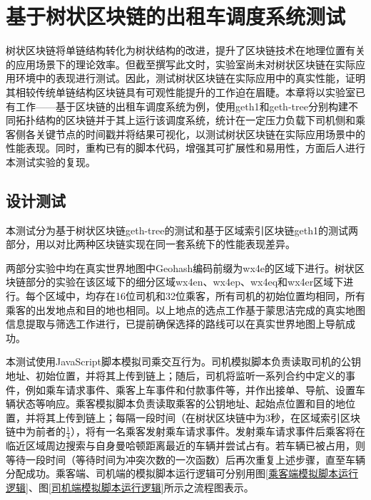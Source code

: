 %
%
%
%
%

\chapter{基于树状区块链的出租车调度系统测试}

树状区块链将单链结构转化为树状结构的改进，提升了区块链技术在地理位置有关的应用场景下的理论效率。但截至撰写此文时，实验室尚未对树状区块链在实际应用环境中的表现进行测试。因此，测试树状区块链在实际应用中的真实性能，证明其相较传统单链结构区块链具有可观性能提升的工作迫在眉睫。本章将以实验室已有工作——基于区块链的出租车调度系统为例，使用geth1和geth-tree分别构建不同拓扑结构的区块链并于其上运行该调度系统，统计在一定压力负载下司机侧和乘客侧各关键节点的时间戳并将结果可视化，以测试树状区块链在实际应用场景中的性能表现。同时，重构已有的脚本代码，增强其可扩展性和易用性，方面后人进行本测试实验的复现。

\section{设计测试}

本测试分为基于树状区块链geth-tree的测试和基于区域索引区块链geth1的测试两部分，用以对比两种区块链实现在同一套系统下的性能表现差异。

两部分实验中均在真实世界地图中Geohash编码前缀为wx4e的区域下进行。树状区块链部分的实验在该区域下的细分区域wx4en、wx4ep、wx4eq和wx4er区域下进行。每个区域中，均存在16位司机和32位乘客，所有司机的初始位置均相同，所有乘客的出发地点和目的地也相同。以上地点的选点工作基于蒙思洁完成的真实地图信息提取与筛选工作进行，已提前确保选择的路线可以在真实世界地图上导航成功。

本测试使用JavaScript脚本模拟司乘交互行为。司机模拟脚本负责读取司机的公钥地址、初始位置，并将其上传到链上；随后，司机将监听一系列合约中定义的事件，例如乘车请求事件、乘客上车事件和付款事件等，并作出接单、导航、设置车辆状态等响应。乘客模拟脚本负责读取乘客的公钥地址、起始点位置和目的地位置，并将其上传到链上；每隔一段时间（在树状区块链中为3秒，在区域索引区块链中为前者的$\frac14$），将有一名乘客发射乘车请求事件。发射乘车请求事件后乘客将在临近区域周边搜索与自身曼哈顿距离最近的车辆并尝试占有。若车辆已被占用，则等待一段时间（等待时间为冲突次数的一次函数）后再次重复上述步骤，直至车辆分配成功。乘客端、司机端的模拟脚本运行逻辑可分别用图\ref{乘客端模拟脚本运行逻辑}、图\ref{司机端模拟脚本运行逻辑}所示之流程图表示。

